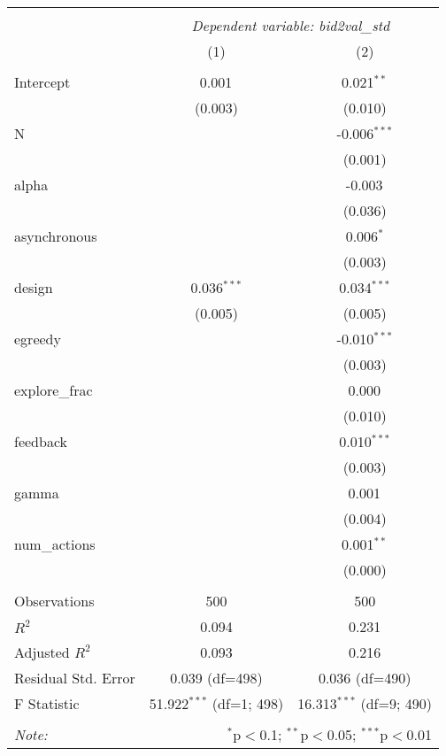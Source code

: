 \begin{table}[!htbp] \centering
\begin{tabular}{@{\extracolsep{5pt}}lcc}
\\[-1.8ex]\hline
\hline \\[-1.8ex]
& \multicolumn{2}{c}{\textit{Dependent variable: bid2val_std}} \
\cr \cline{2-3}
\\[-1.8ex] & (1) & (2) \\
\hline \\[-1.8ex]
 Intercept & 0.001$^{}$ & 0.021$^{**}$ \\
& (0.003) & (0.010) \\
 N & & -0.006$^{***}$ \\
& & (0.001) \\
 alpha & & -0.003$^{}$ \\
& & (0.036) \\
 asynchronous & & 0.006$^{*}$ \\
& & (0.003) \\
 design & 0.036$^{***}$ & 0.034$^{***}$ \\
& (0.005) & (0.005) \\
 egreedy & & -0.010$^{***}$ \\
& & (0.003) \\
 explore_frac & & 0.000$^{}$ \\
& & (0.010) \\
 feedback & & 0.010$^{***}$ \\
& & (0.003) \\
 gamma & & 0.001$^{}$ \\
& & (0.004) \\
 num_actions & & 0.001$^{**}$ \\
& & (0.000) \\
\hline \\[-1.8ex]
 Observations & 500 & 500 \\
 $R^2$ & 0.094 & 0.231 \\
 Adjusted $R^2$ & 0.093 & 0.216 \\
 Residual Std. Error & 0.039 (df=498) & 0.036 (df=490) \\
 F Statistic & 51.922$^{***}$ (df=1; 498) & 16.313$^{***}$ (df=9; 490) \\
\hline
\hline \\[-1.8ex]
\textit{Note:} & \multicolumn{2}{r}{$^{*}$p$<$0.1; $^{**}$p$<$0.05; $^{***}$p$<$0.01} \\
\end{tabular}
\end{table}
